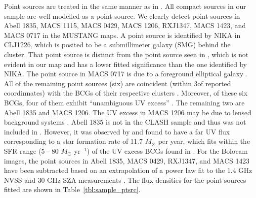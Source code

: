 \documentclass[iop,numberedappendix,apj]{emulateapj}
\newcommand{\quotes}[1]{``#1''}
\begin{document}
Point sources are treated in the same manner as in \citet{romero2015a}. All compact sources in our sample
are well modelled as a point source. We clearly detect point sources in Abell 1835, MACS 1115, MACS 0429, 
MACS 1206, RXJ1347, MACS 1423, and MACS 0717 in the MUSTANG maps. A point source is identified by NIKA 
\citep{adam2015} in CLJ1226, which is posited to be a submillimeter galaxy (SMG) behind the cluster. That
point source is distinct from the point source seen in \citet{korngut2011}, which is not evident in our map
and has a lower fitted significance than the one identified by NIKA. 
The point source in MACS 0717 is due to a foreground elliptical galaxy \citep{mroczkowski2012}.
All of the remaining point sources (six) are coincident (within 3\asecs of reported coordinnates) with the BCGs 
of their respective clusters \citep[][]{crawford1999,donahue2015}. 
Moreover, of these six BCGs, four of them exhibit \quotes{unambiguous UV excess} \citep{donahue2015}. 
The remaining two are Abell 1835 and MACS 1206. The UV excess in MACS 1206 may be due to lensed
background systems \citep{donahue2015}. Abell 1835 is not in the CLASH sample and thus was not
included in \citet{donahue2015}. However, it was observed by \citet{odea2010} and found to have a 
far UV flux corresponding to a star formation rate of 11.7 $M_{\odot}$ per year, which fits within the SFR range 
(5 - 80 $M_{\odot}$ yr$^{-1}$) of the UV excess BCGs found in \citep{donahue2015}.
For the Bolocam images, the point sources in Abell 1835, MACS 0429, RXJ1347, and MACS 1423
have been subtracted based on an extrapolation of a power law fit to the 1.4 GHz NVSS \citep{condon1998}
and 30 GHz SZA \citep{mroczkowski2009} measurements \citep{sayers2012}. The flux densities for
the point sources fitted are shown in Table~\ref{tbl:sample_ptsrc}.
\end{document}
